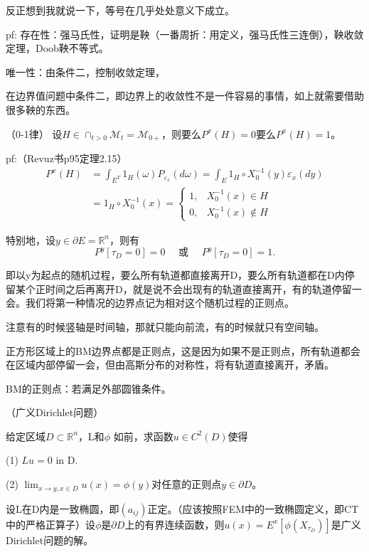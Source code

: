 反正想到我就说一下，等号在几乎处处意义下成立。

pf: 存在性：强马氏性，证明是鞅（一番周折：用定义，强马氏性三连倒），鞅收敛定理，Doob鞅不等式。

唯一性：由条件二，控制收敛定理，

在边界值问题中条件二，即边界上的收敛性不是一件容易的事情，如上就需要借助很多鞅的东西。

\begin{lem}（0-1律）
  设$H \in \cap_{t>0} \mathcal{M}_{t} = \mathcal{M}_{0+}$，则要么$P^{x}(H)=0$要么$P^{x}(H)=1$。
\end{lem}

pf:（Revuz书p95定理2.15）
\[
  \begin{aligned}
    P^{x}(H) &= \int_{E^T} 1_H(\omega) P_{\varepsilon_x}(d\omega) = \int_E 1_H \circ X_0^{-1}(y) \varepsilon_x(dy)\\ 
    &= 1_H \circ X_0^{-1}(x) = \left\{ \begin{array}{ll}
      1, & X_0^{-1}(x) \in H\\
      0, & X_0^{-1}(x) \notin H
    \end{array} \right.
  \end{aligned}
\]

特别地，设$y \in \partial E = \mathbb{R}^n$，则有
\[
  P^{y}\left[\tau_{D}=0\right]=0 \quad \text { 或 } \quad P^{y}\left[\tau_{D}=0\right]=1.
\]

即以y为起点的随机过程，要么所有轨道都直接离开D，要么所有轨道都在D内停留某个正时间之后再离开D，就是说不会出现有的轨道直接离开，有的轨道停留一会。我们将第一种情况的边界点记为相对这个随机过程的正则点。

注意有的时候竖轴是时间轴，那就只能向前流，有的时候就只有空间轴。

正方形区域上的BM边界点都是正则点，这是因为如果不是正则点，所有轨道都会在区域内部停留一会，但由高斯分布的对称性，将有轨道直接离开，矛盾。

BM的正则点：若满足外部圆锥条件。

\begin{df}（广义Dirichlet问题）
  
  给定区域$D \subset \mathbb{R}^{n}$，L和$\phi$  如前，求函数$u \in C^{2}(D)$使得
  
  (1) $L u=0$ in D.
  
  (2) $\lim_{x \rightarrow y, x \in D} u(x)=\phi(y)$对任意的正则点$y \in \partial D$。
\end{df}

\begin{thm}
  设L在D内是一致椭圆，即$\left(a_{i j}\right)$正定。（应该按照FEM中的一致椭圆定义，即CT中的严格正算子）设$\phi$是$\partial D$上的有界连续函数，则$u(x)=E^{x}\left[\phi\left(X_{\tau_{D}}\right)\right]$是广义Dirichlet问题的解。
\end{thm}

